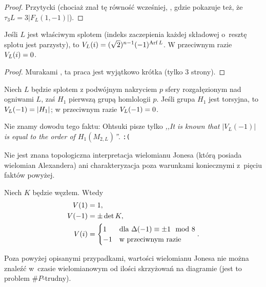 \begin{proof}
%
    Przytycki \cite{przytycki1998} (chociaż znał tę równość wcześniej, \cite[s. 200]{przytycki1995}, gdzie pokazuje też, że $\tau_3 L = 3 |F_L(1, -1)|$).
\end{proof}

\begin{proposition}
    Jeśli $L$ jest właściwym splotem (indeks zaczepienia każdej składowej o~resztę splotu jest parzysty), to $V_L(i) = (\sqrt 2)^{n-1}(-1)^{\operatorname{Arf} L}$.
    W przeciwnym razie $V_L(i) = 0$.
\end{proposition}

\begin{proof}
%
    Murakami \cite{murakami1986}, ta praca jest wyjątkowo krótka (tylko 3 strony).
\end{proof}

\begin{proposition}
    Niech $L$ będzie splotem z podwójnym nakryciem $p$ sfery rozgałęzionym nad ogniwami $L$, zaś $H_1$ pierwszą grupą homlologii $p$.
    Jeśli grupa $H_1$ jest torsyjna, to $V_L(-1) = |H_1|$; w przeciwnym razie $V_L(-1) = 0$.
\end{proposition}

Nie znamy dowodu tego faktu: Ohtsuki \cite[s. 383]{ohtsuki2002} pisze tylko \emph{,,It is known that $|V_L(-1)|$ is equal to the order of $H_1(M_{2,L})$''}. \hfill \texttt{:(}


Nie jest znana topologiczna interpretacja wielomianu Jonesa (którą posiada wielomian Alexandera) ani charakteryzacja poza warunkami koniecznymi z~pięciu faktów powyżej.

\begin{corollary}
    Niech $K$ będzie węzłem.
    Wtedy
    \begin{align}
        V(1) & = 1, \\
        V(-1) & = \pm \det K, \\
        V(i) & = \begin{cases}
            1 & \text{dla } \Delta(-1) \equiv \pm 1 \mod 8 \\
            -1 & \text{w przeciwnym razie}
        \end{cases}.
    \end{align}
\end{corollary}

Poza powyżej opisanymi przypadkami, wartości wielomianu Jonesa nie można znaleźć w~czasie wielomianowym od ilości skrzyżowań na diagramie (jest to problem $\#P$-trudny).




